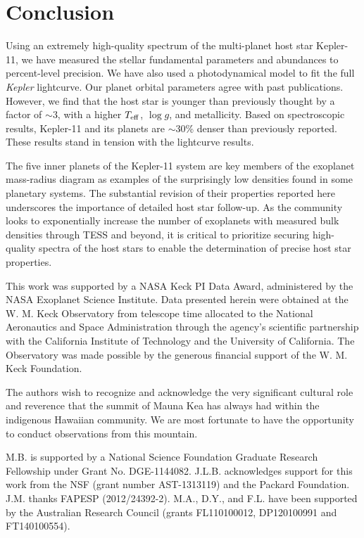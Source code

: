 \documentclass[twocolumn,trackchanges]{aastex61}
\newcommand{\teff}{$T_{\rm eff}$}
\newcommand{\logg}{$\log g$}
\newcommand{\Kepler}{\textit{Kepler} }
\begin{document}
\section{Conclusion}

Using an extremely high-quality spectrum of the multi-planet host star Kepler-11, we have measured the stellar fundamental parameters and abundances to percent-level precision. We have also used a photodynamical model to fit the full \Kepler lightcurve. Our planet orbital parameters agree with past publications. However, we find that the host star is younger than previously thought by a factor of $\sim$3, with a higher \teff, \logg, and metallicity. Based on spectroscopic results, Kepler-11 and its planets are $\sim$30\% denser than previously reported. These results stand in tension with the lightcurve results.

The five inner planets of the Kepler-11 system are key members of the exoplanet mass-radius diagram as examples of the surprisingly low densities found in some planetary systems. The substantial revision of their properties reported here underscores the importance of detailed host star follow-up. As the community looks to exponentially increase the number of exoplanets with measured bulk densities through TESS and beyond, it is critical to prioritize securing high-quality spectra of the host stars to enable the determination of precise host star properties.

\bigskip
\acknowledgements


This work was supported by a NASA Keck PI Data Award, administered by the NASA Exoplanet Science Institute. Data presented herein were obtained at the W. M. Keck Observatory from telescope time allocated to the National Aeronautics and Space Administration through the agency's scientific partnership with the California Institute of Technology and the University of California. The Observatory was made possible by the generous financial support of the W. M. Keck Foundation.

The authors wish to recognize and acknowledge the very significant cultural role and reverence that the summit of Mauna Kea has always had within the indigenous Hawaiian community. We are most fortunate to have the opportunity to conduct observations from this mountain.

M.B. is supported by a National Science Foundation Graduate Research Fellowship under Grant No. DGE-1144082.  J.L.B. acknowledges support for this work from the NSF (grant number AST-1313119) and the Packard Foundation.  J.M. thanks FAPESP (2012/24392-2). M.A., D.Y., and F.L. have been supported by the Australian Research Council
(grants FL110100012, DP120100991 and FT140100554).
\end{document}

